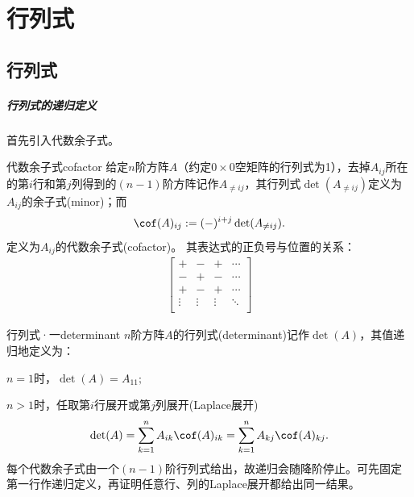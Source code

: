 \chapter{行列式}

\section{行列式}

\paragraph{行列式的递归定义}

首先引入代数余子式。

\begin{definition}{代数余子式}{cofactor}
	给定$n$阶方阵$A$（约定$0\times0$空矩阵的行列式为1），去掉$A_{ij}$所在的第$i$行和第$j$列得到的$(n-1)$阶方阵记作$A_{\neq ij}$，其行列式$\det(A_{\neq ij})$定义为$A_{ij}$的余子式(minor)；而
	\begin{align}
		\cof(A)_{ij}:=(-)^{i+j}\det(A_{\neq ij}).
	\end{align}
	定义为$A_{ij}$的代数余子式(cofactor)。
	其表达式的正负号与位置的关系：
	\begin{align}
		\begin{bmatrix}
			+&-&+&\cdots\\
			-&+&-&\cdots\\
			+&-&+&\cdots\\
			\vdots&\vdots&\vdots&\ddots\\
		\end{bmatrix}
	\end{align}
\end{definition}
\begin{definition}{行列式·一}{determinant}
	$n$阶方阵$A$的行列式(determinant)记作$\det(A)$，其值递归地定义为：
	\begin{compactenum}
		\item $n=1$时，$\det(A)=A_{11};$
		\item $n>1$时，任取第$i$行展开或第$j$列展开(Laplace展开)
		\begin{align}
			\det(A)=\sum_{k=1}^nA_{ik}\cof(A)_{ik}=\sum_{k=1}^nA_{kj}\cof(A)_{kj}.
		\end{align}
		每个代数余子式由一个$(n-1)$阶行列式给出，故递归会随降阶停止。可先固定第一行作递归定义，再证明任意行、列的Laplace展开都给出同一结果。
	\end{compactenum}
\end{definition}


